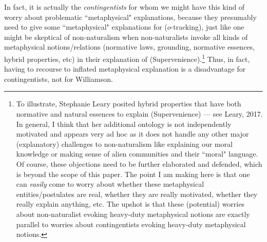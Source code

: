 In fact, it is actually the \emph{contingentists} for whom we might have this kind of worry about problematic ``metaphysical" explanations, because they presumably need to give some ``metaphysical" explanations for ($o$-tracking), just like one might be skeptical of non-naturalism when non-naturalists invoke all kinds of metaphysical notions/relations (normative laws, grounding, normative essences, hybrid properties, etc) in their explanation of (Supervenience).\footnote{To illustrate, Stephanie Leary posited hybrid properties that have both normative and natural essences to explain (Supervenience) --- see Leary, 2017. In general, I think that her additional ontology is not independently motivated and appears very ad hoc as it does not handle any other major (explanatory) challenges to non-naturalism like explaining our moral knowledge or making sense of alien communities and their ``moral" language. Of course, these objections need to be further elaborated and defended, which is beyond the scope of this paper. The point I am making here is that one can \emph{easily} come to worry about whether these metaphysical entities/postulates are real, whether they are really motivated, whether they really explain anything, etc. The upshot is that these (potential) worries about non-naturalist evoking heavy-duty metaphysical notions are exactly parallel to worries about contingentists evoking heavy-duty metaphysical notions.} Thus, in fact, having to recourse to inflated metaphysical explanation is a disadvantage for contingentists, not for Williamson. 

